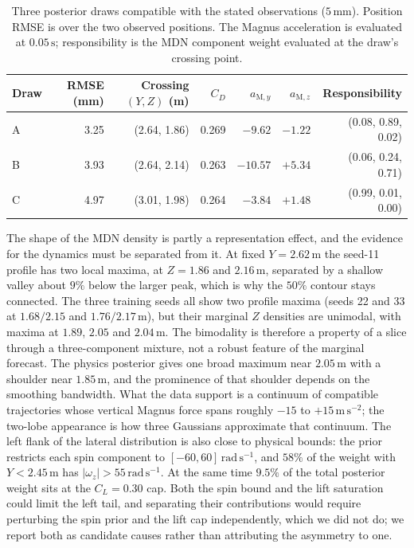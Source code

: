 \documentclass[11pt,a4paper]{article}
\begin{document}
\begin{table}[htbp]
  \centering
  \small
  \caption{Three posterior draws compatible with the stated observations ($5\,\mathrm{mm}$). Position RMSE is over the two observed positions. The Magnus acceleration is evaluated at $0.05\,\mathrm{s}$; responsibility is the MDN component weight evaluated at the draw's crossing point.}
  \label{tab:traj}
  \begin{tabular}{lrrrrrr}
    \toprule
    Draw & RMSE (mm) & Crossing $(Y,Z)$ (m) & $C_D$ & $a_{\mathrm{M},y}$ & $a_{\mathrm{M},z}$ & Responsibility \\
    \midrule
    A & 3.25 & (2.64, 1.86) & 0.269 & $-9.62$ & $-1.22$ & (0.08, 0.89, 0.02) \\
    B & 3.93 & (2.64, 2.14) & 0.263 & $-10.57$ & $+5.34$ & (0.06, 0.24, 0.71) \\
    C & 4.97 & (3.01, 1.98) & 0.264 & $-3.84$ & $+1.48$ & (0.99, 0.01, 0.00) \\
    \bottomrule
  \end{tabular}
\end{table}

The shape of the MDN density is partly a representation effect, and the evidence for the dynamics must be separated from it. At fixed $Y=2.62\,\mathrm{m}$ the seed-11 profile has two local maxima, at $Z=1.86$ and $2.16\,\mathrm{m}$, separated by a shallow valley about $9\%$ below the larger peak, which is why the $50\%$ contour stays connected. The three training seeds all show two profile maxima (seeds 22 and 33 at $1.68/2.15$ and $1.76/2.17\,\mathrm{m}$), but their marginal $Z$ densities are unimodal, with maxima at $1.89$, $2.05$ and $2.04\,\mathrm{m}$. The bimodality is therefore a property of a slice through a three-component mixture, not a robust feature of the marginal forecast. The physics posterior gives one broad maximum near $2.05\,\mathrm{m}$ with a shoulder near $1.85\,\mathrm{m}$, and the prominence of that shoulder depends on the smoothing bandwidth. What the data support is a continuum of compatible trajectories whose vertical Magnus force spans roughly $-15$ to $+15\,\mathrm{m\,s^{-2}}$; the two-lobe appearance is how three Gaussians approximate that continuum. The left flank of the lateral distribution is also close to physical bounds: the prior restricts each spin component to $[-60,60]\,\mathrm{rad\,s^{-1}}$, and $58\%$ of the weight with $Y<2.45\,\mathrm{m}$ has $|\omega_z|>55\,\mathrm{rad\,s^{-1}}$. At the same time $9.5\%$ of the total posterior weight sits at the $C_L=0.30$ cap. Both the spin bound and the lift saturation could limit the left tail, and separating their contributions would require perturbing the spin prior and the lift cap independently, which we did not do; we report both as candidate causes rather than attributing the asymmetry to one.
\end{document}

